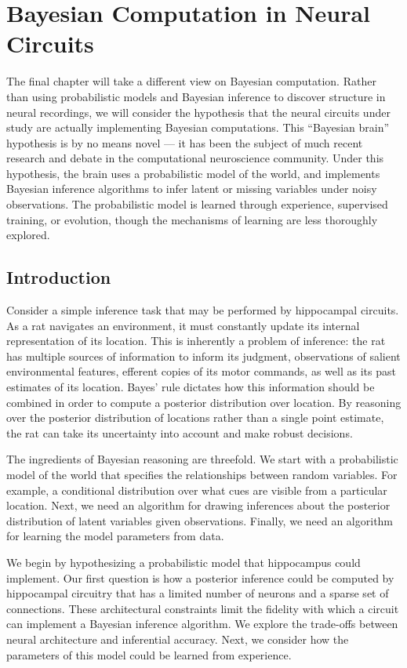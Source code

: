 \chapter{Bayesian Computation in Neural Circuits}

The final chapter will take a different view on Bayesian computation.
Rather than using probabilistic models and Bayesian inference to 
discover structure in neural recordings, we will consider the 
hypothesis that the neural circuits under study are actually 
implementing Bayesian computations. This ``Bayesian brain'' hypothesis 
is by no means novel --- it has been the subject of much recent 
research and debate in the computational neuroscience community. 
Under this hypothesis, the brain uses a probabilistic model 
of the world, and implements Bayesian inference algorithms to 
infer latent or missing variables under noisy observations. 
The probabilistic model is learned through experience, supervised 
training, or evolution, though the mechanisms of learning are 
less thoroughly explored. 

\section{Introduction} 
Consider a simple inference task that may be performed by hippocampal circuits. 
As a rat navigates an environment, it must constantly update its internal 
representation of its location. This is inherently a problem of inference: 
the rat has multiple sources of information to inform its judgment, observations
of salient environmental features, efferent copies of its motor commands, as
well as its past estimates of its location. Bayes' rule dictates how this 
information should be combined in order to compute a posterior distribution 
over location. By reasoning over the posterior distribution of locations 
rather than a single point estimate, the rat can take its uncertainty into 
account and make robust decisions. 

The ingredients of Bayesian reasoning are threefold. We start with a 
probabilistic model of the world that specifies the relationships between
random variables. For example, a conditional distribution over what cues 
are visible from a particular location. Next, we need an algorithm for 
drawing inferences about the posterior distribution of latent variables 
given observations. Finally, we need an algorithm for learning the 
model parameters from data. 

We begin by hypothesizing a probabilistic model that hippocampus could implement.
Our first question is how a posterior inference could be computed by hippocampal 
circuitry that has a limited number of neurons and a sparse set of connections.
These architectural constraints limit the fidelity with which a circuit can 
implement a Bayesian inference algorithm. We explore the trade-offs between 
neural architecture and inferential accuracy. Next, we consider how the 
parameters of this model could be learned from experience.

